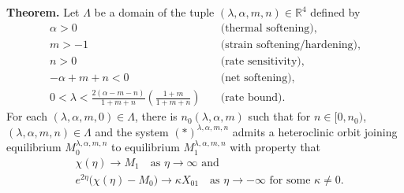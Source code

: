 \documentclass{beamer}
\begin{document}
\begin{frame}
  {\bf Theorem.} Let $\Lambda$ be a domain of the tuple $(\lambda,\alpha,m,n)\in\mathbb{R}^4$ defined by %
  {\scriptsize
 \begin{align*}
  \alpha>0\quad&\text{(thermal softening)},\\
  m>-1 \quad&\text{(strain softening/hardening)}, \\%
  n>0 \quad&\text{(rate sensitivity)},\\ %
  -\alpha+m+n<0 \quad&\text{(net softening)}, \\%
  0< \lambda < \frac{2(\alpha-m-n)}{1+m+n}\left(\frac{1+m}{1+m+n}\right) \quad&\text{(rate bound)}. %
\end{align*}}
 For each $(\lambda,\alpha,m,0) \in \Lambda$, there is $n_0( \lambda,\alpha,m)$ such that for $n \in [0, n_0)$, $(\lambda,\alpha,m,n) \in \Lambda$ and the system $(*)^{\lambda,\alpha,m,n}$ admits a heteroclinic orbit joining equilibrium $M_0^{\lambda,\alpha,m,n}$ to equilibrium $M_1^{\lambda,\alpha,m,n}$ with property that
    \begin{align*}%
        &\chi(\eta) \rightarrow M_1 \quad \text{as $\eta \rightarrow \infty$ and} \\
        &e^{2\eta}\big(\chi(\eta) - M_0\big) \rightarrow \kappa X_{01} \quad \text{as $\eta \rightarrow -\infty$ for some $\kappa\ne0$}.
    \end{align*}
\end{frame}








% 
\end{document}
